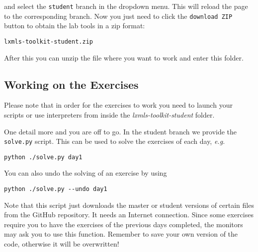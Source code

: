 \noindent and select the \verb+student+ branch in the dropdown menu. This will reload the page to the corresponding branch. Now you just need to click the \verb+download ZIP+ button to obtain the lab tools in a zip format:

\begin{verbatim}
lxmls-toolkit-student.zip
\end{verbatim}

After this you can unzip the file where you want to work and enter this folder.

\subsection{Working on the Exercises}

Please note that in order for the exercises to work you need to launch your scripts or use interpreters from inside the  \textit{lxmls-toolkit-student} folder.

One detail more and you are off to go. In the student branch we provide the \verb+solve.py+ script. This can be used to solve the exercises of each day, \emph{e.g.}

\begin{verbatim}
python ./solve.py day1
\end{verbatim}

\noindent You can also undo the solving of an exercise by using

\begin{verbatim}
python ./solve.py --undo day1
\end{verbatim}

Note that this script just downloads the master or student versions of certain files from the GitHub repository. It needs an Internet connection. Since some exercises require you to have the exercises of the previous days completed, the monitors may ask you to use this function. Remember to save your own version of the code, otherwise it will be overwritten!

